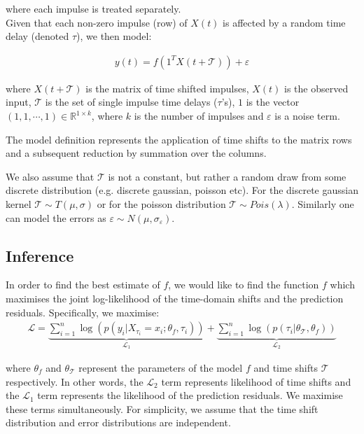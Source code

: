 \documentclass[11pt]{amsart}
\begin{document}
where each impulse is treated separately. \\

Given that each non-zero impulse (row) of $X(t)$ is affected by a random time delay (denoted $\tau$), we then model:

\begin{align}\label{Eqn:ModelSpecification}
y(t)= f(1^TX(t + \mathcal{T})) + \varepsilon
\end{align}

where $X(t + \mathcal{T})$ is the matrix of time shifted impulses, $X(t)$ is the observed input, $\mathcal{T}$ is the set of single impulse time delays ($\tau$'s), $1$ is the vector $(1,1,\cdots, 1)\in 
\mathbb{R}^{1 \times k}$, where $k$ is the number of impulses and $\varepsilon$ is a noise term. 

The model definition represents the application of time shifts to the matrix rows and a subsequent reduction by summation over the columns. 

We also assume that $\mathcal{T}$ is not a constant, but rather a random draw from some discrete distribution (e.g. discrete gaussian, poisson etc). For the discrete gaussian kernel $\mathcal{T}\sim T(\mu, \sigma)$ or for the poisson distribution $\mathcal{T}\sim Pois(\lambda)$. Similarly one can model the errors as  $\varepsilon \sim N(\mu, \sigma_{\varepsilon})$. 
\subsection{Inference}

In order to find the best estimate of $f$, we would like to find the function $f$ which maximises the joint log-likelihood of the time-domain shifts and the prediction residuals. Specifically, we maximise:
\begin{align}
    \mathcal{L} = 
    \underbrace{\sum_{i=1}^{n} \log(p(y_i | X_{\tau_i} = x_i; \theta_{f}, \tau_i))}_{\mathcal{L}_1} 
    + 
    \underbrace{\sum_{i=1}^{n} \log(p(\tau_i| \theta_{\mathcal{T}}, \theta_{f}))}_{\mathcal{L}_2}
\end{align}

where $\theta_{f}$ and $\theta_{\mathcal{T}}$ represent the parameters of the model $f$ and time shifts $\mathcal{T}$ respectively. In other words, the $\mathcal{L}_2$ term represents likelihood of time shifts and the $\mathcal{L}_1$ term represents the likelihood of the prediction residuals. We maximise these terms simultaneously. For simplicity, we assume that the time shift distribution and error distributions are independent. 
\end{document}
